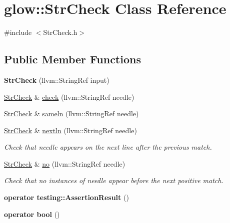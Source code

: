 \hypertarget{classglow_1_1_str_check}{}\section{glow\+:\+:Str\+Check Class Reference}
\label{classglow_1_1_str_check}


{\ttfamily \#include $<$Str\+Check.\+h$>$}

\subsection*{Public Member Functions}
\begin{DoxyCompactItemize}
\item 
\mbox{\label{classglow_1_1_str_check_a269c998b1e948e0342ea30cd364fd0ac}} 
{\bfseries Str\+Check} (llvm\+::\+String\+Ref input)
\item 
\hyperlink{classglow_1_1_str_check}{Str\+Check} \& \hyperlink{classglow_1_1_str_check_a5f4ae7f23e0ad003b24683e875148f26}{check} (llvm\+::\+String\+Ref needle)
\item 
\hyperlink{classglow_1_1_str_check}{Str\+Check} \& \hyperlink{classglow_1_1_str_check_a83d72ca6e91ae0c3b7ef40609b760a27}{sameln} (llvm\+::\+String\+Ref needle)
\item 
\mbox{\label{classglow_1_1_str_check_af98ac5f775f0fe3ca67804b16f534cf3}} 
\hyperlink{classglow_1_1_str_check}{Str\+Check} \& \hyperlink{classglow_1_1_str_check_af98ac5f775f0fe3ca67804b16f534cf3}{nextln} (llvm\+::\+String\+Ref needle)
\begin{DoxyCompactList}\small\item\em Check that {\ttfamily needle} appears on the next line after the previous match. \end{DoxyCompactList}\item 
\mbox{\label{classglow_1_1_str_check_ae517fdf31d8c9ccbe9dbb28ecf28f088}} 
\hyperlink{classglow_1_1_str_check}{Str\+Check} \& \hyperlink{classglow_1_1_str_check_ae517fdf31d8c9ccbe9dbb28ecf28f088}{no} (llvm\+::\+String\+Ref needle)
\begin{DoxyCompactList}\small\item\em Check that no instances of {\ttfamily needle} appear before the next positive match. \end{DoxyCompactList}\item 
\mbox{\label{classglow_1_1_str_check_a59f49193401ebfd4687bf569f9da136d}} 
{\bfseries operator testing\+::\+Assertion\+Result} ()
\item 
\mbox{\label{classglow_1_1_str_check_a79f3d949aca0438342c6181c0108e13b}} 
{\bfseries operator bool} ()
\end{DoxyCompactItemize}


